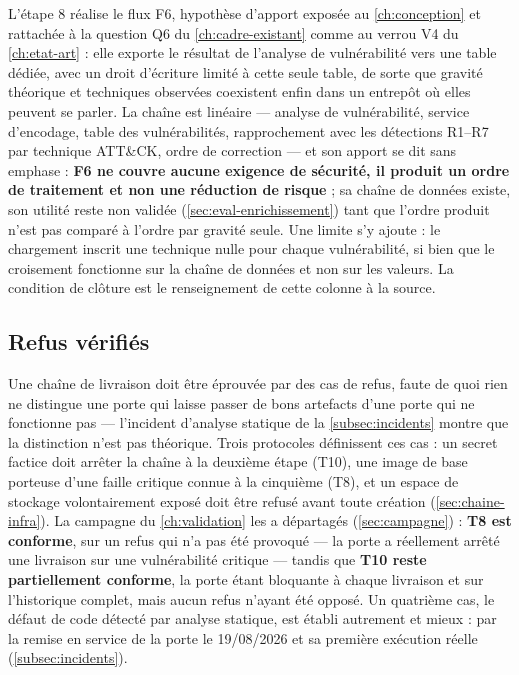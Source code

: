 L'étape 8 réalise le flux F6, hypothèse d'apport exposée au \cref{ch:conception} et rattachée à la
question Q6 du \cref{ch:cadre-existant} comme au verrou V4 du \cref{ch:etat-art} : elle exporte le résultat de l'analyse
de vulnérabilité vers une table dédiée, avec un droit d'écriture limité à cette seule table, de
sorte que gravité théorique et techniques observées coexistent enfin dans un entrepôt où elles
peuvent se parler. La chaîne est linéaire --- analyse de vulnérabilité, service d'encodage, table
des vulnérabilités, rapprochement avec les détections R1--R7 par technique ATT\&CK, ordre de
correction --- et son apport se dit sans emphase : \textbf{F6 ne couvre aucune exigence de
sécurité, il produit un ordre de traitement et non une réduction de risque} ; sa chaîne de
données existe, son utilité reste non validée (\cref{sec:eval-enrichissement}) tant que l'ordre
produit n'est pas comparé à l'ordre par gravité seule. Une limite s'y ajoute : le chargement
inscrit une technique nulle pour chaque vulnérabilité, si bien que le croisement fonctionne sur la
chaîne de données et non sur les valeurs. La condition de clôture est le renseignement de cette
colonne à la source.

\subsection{Refus vérifiés}
\label{subsec:refus}

Une chaîne de livraison doit être éprouvée par des cas de refus, faute de quoi rien ne distingue une
porte qui laisse passer de bons artefacts d'une porte qui ne fonctionne pas --- l'incident d'analyse
statique de la \cref{subsec:incidents} montre que la distinction n'est pas théorique. Trois
protocoles définissent ces cas : un secret factice doit arrêter la chaîne à la deuxième étape (T10),
une image de base porteuse d'une faille critique connue à la cinquième (T8), et un espace de
stockage volontairement exposé doit être refusé avant toute création (\cref{sec:chaine-infra}). La
campagne du \cref{ch:validation} les a départagés (\cref{sec:campagne}) : \textbf{T8 est conforme}, sur un
refus qui n'a pas été provoqué --- la porte a réellement arrêté une livraison sur une vulnérabilité
critique --- tandis que \textbf{T10 reste partiellement conforme}, la porte étant bloquante à chaque
livraison et sur l'historique complet, mais aucun refus n'ayant été opposé. Un quatrième cas, le
défaut de code détecté par analyse statique, est établi autrement et mieux : par la remise en
service de la porte le 19/08/2026 et sa première exécution réelle (\cref{subsec:incidents}).

